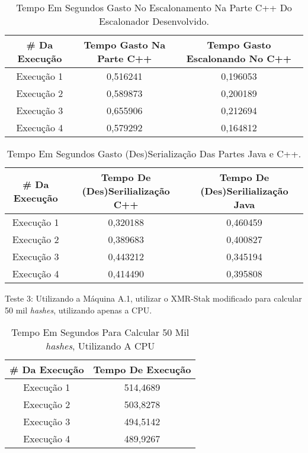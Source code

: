 \begin {table}[H]
\begin{center}
	\begin{tabular}{ |c|c|c| } 
		\hline
		\#  Da Execução & Tempo Gasto Na Parte C++ & Tempo Gasto Escalonando No C++ \\ 
		\hline
		Execução 1 & 0,516241 & 0,196053 \\ 
		\hline
		Execução 2 & 0,589873 & 0,200189 \\ 
		\hline
		Execução 3 & 0,655906 & 0,212694 \\ 
		\hline
		Execução 4 & 0,579292 & 0,164812 \\ 
		\hline
	\end{tabular}
	\caption {Tempo Em Segundos Gasto No Escalonamento Na Parte C++ Do Escalonador Desenvolvido.} \label{TabelaTempoEscalonadorNovo2} 
\end{center}
\end {table}

\begin {table}[H]
\begin{center}
	\begin{tabular}{ |c|c|c| } 
		\hline
		\#  Da Execução & Tempo De (Des)Serilialização C++ & Tempo De (Des)Serilialização Java \\ 
		\hline
		Execução 1 & 0,320188 & 0,460459 \\ 
		\hline
		Execução 2 & 0,389683 & 0,400827 \\ 
		\hline
		Execução 3 & 0,443212 & 0,345194 \\ 
		\hline
		Execução 4 & 0,414490 & 0,395808 \\ 
		\hline
	\end{tabular}
	\caption {Tempo Em Segundos Gasto (Des)Serialização Das Partes Java e C++.} \label{TabelaTempoEscalonadorNovo3} 
\end{center}
\end {table}

Teste 3: Utilizando a Máquina A.1, utilizar o XMR-Stak modificado para calcular 50 mil \textit{hashes}, utilizando apenas a \acrshort{CPU}.

\begin {table}[H]
\begin{center}
	\begin{tabular}{ |c|c| } 
		\hline
		\#  Da Execução & Tempo De Execução \\ 
		\hline
		Execução 1 & 514,4689 \\ 
		\hline
		Execução 2 & 503,8278 \\ 
		\hline
		Execução 3 & 494,5142 \\ 
		\hline
		Execução 4 & 489,9267 \\ 
		\hline
	\end{tabular}
	\caption {Tempo Em Segundos Para Calcular 50 Mil \textit{hashes}, Utilizando A \acrshort{CPU}} \label{TabelaTempoXMR-Stak-CPU} 
\end{center}
\end {table}

